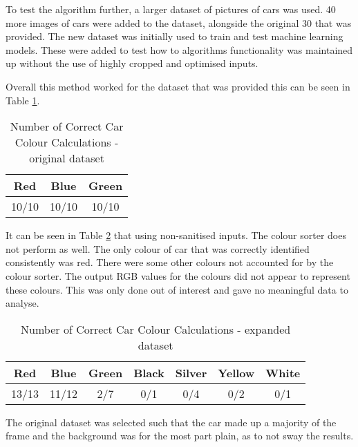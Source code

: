 \documentclass[conference]{IEEEtran}
\begin{document}
To test the algorithm further, a larger dataset of pictures of cars was used. 40 more images of cars were added to the dataset, alongside the original 30 that was provided. The new dataset was initially used to train and test machine learning models. \cite{ref:KrauseStarkDengFei-Fei_3DRR2013} These were added to test how to algorithms functionality was maintained up without the use of highly cropped and optimised inputs.

Overall this method worked for the dataset that was provided this can be seen in Table \ref{table:car_colours_original_dataset}.

\begin{table}
\begin{center}
\caption{Number of Correct Car Colour Calculations - original dataset}
\begin{tabular}{ || c || c || c || }
\hline
 Red & Blue & Green\\ 
\hline
 10/10 & 10/10 & 10/10 \\  
\hline

\end{tabular}
\label{table:car_colours_original_dataset}
\end{center}
\end{table}

It can be seen in Table \ref{table:car_colours_expanded_dataset} that using non-sanitised inputs. The colour sorter does not perform as well. The only colour of car that was correctly identified consistently was red.  There were some other colours not accounted for by the colour sorter. The output RGB values for the colours did not appear to represent these colours. This was only done out of interest and gave no meaningful data to analyse. 

\begin{table}
\begin{center}
\caption{Number of Correct Car Colour Calculations - expanded dataset}
\begin{tabular}{ || c || c || c || c || c || c || c || }
\hline
 Red & Blue & Green & Black & Silver & Yellow & White\\ 
\hline
 13/13 & 11/12 & 2/7 & 0/1 & 0/4 & 0/2 & 0/1 \\  
\hline

\end{tabular}
\label{table:car_colours_expanded_dataset}
\end{center}
\end{table}


The original dataset was selected such that the car made up a majority of the frame and the background was for the most part plain, as to not sway the results.
\end{document}
